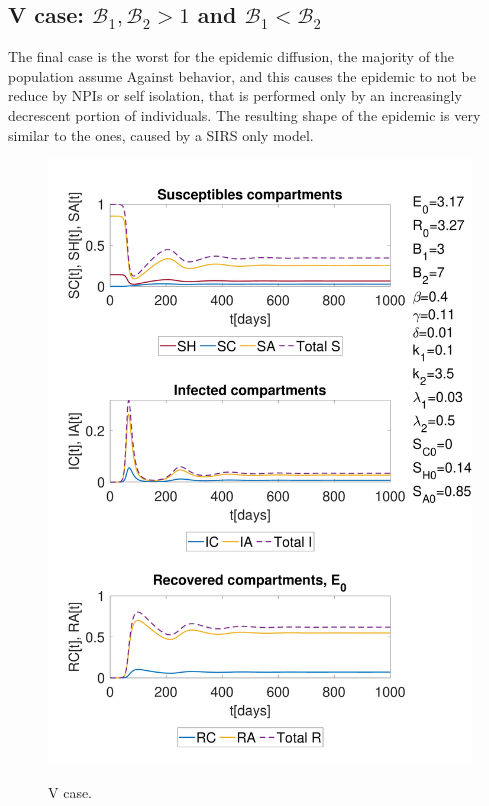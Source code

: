 \subsection{V case:  $\mathcal{B}_1, \mathcal{B}_2 >1$ and $\mathcal{B}_1 <  \mathcal{B}_2$}
The final case is the worst for the epidemic diffusion, the majority of the population assume Against behavior, and this causes the epidemic to not be reduce by NPIs or self isolation, that is performed only by an increasingly decrescent portion of individuals. The resulting shape of the epidemic is very similar to the ones, caused by a SIRS only model.

\begin{figure}[h]
	\centering
	{\includegraphics[width=0.5\linewidth]{1_corpo/figure/behav_epi_sim/E_0_model_3epi_behav_sim_B2_mag_B1}} 
	\caption[Full model simulation figure third]{V case.}
	\label{fig:sim_B1_less_B2}
\end{figure}

